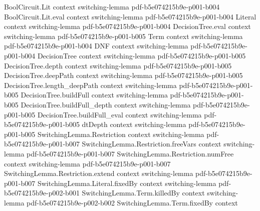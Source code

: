 \begin{lemma}
\label{SwitchingLemma.canonicalDTree_deepPath_length_ge}
\leanok
{}
\proofstep
  {BoolCircuit.Lit}
  {context}
  {switching-lemma}
  {pdf-b5e074215b9e-p001-b004}
\proofstep
  {BoolCircuit.Lit.eval}
  {context}
  {switching-lemma}
  {pdf-b5e074215b9e-p001-b004}
\proofstep
  {Literal}
  {context}
  {switching-lemma}
  {pdf-b5e074215b9e-p001-b004}
\proofstep
  {DecisionTree.eval}
  {context}
  {switching-lemma}
  {pdf-b5e074215b9e-p001-b005}
\proofstep
  {Term}
  {context}
  {switching-lemma}
  {pdf-b5e074215b9e-p001-b004}
\proofstep
  {DNF}
  {context}
  {switching-lemma}
  {pdf-b5e074215b9e-p001-b004}
\proofstep
  {DecisionTree}
  {context}
  {switching-lemma}
  {pdf-b5e074215b9e-p001-b005}
\proofstep
  {DecisionTree.depth}
  {context}
  {switching-lemma}
  {pdf-b5e074215b9e-p001-b005}
\proofstep
  {DecisionTree.deepPath}
  {context}
  {switching-lemma}
  {pdf-b5e074215b9e-p001-b005}
\proofstep
  {DecisionTree.length_deepPath}
  {context}
  {switching-lemma}
  {pdf-b5e074215b9e-p001-b005}
\proofstep
  {DecisionTree.buildFull}
  {context}
  {switching-lemma}
  {pdf-b5e074215b9e-p001-b005}
\proofstep
  {DecisionTree.buildFull_depth}
  {context}
  {switching-lemma}
  {pdf-b5e074215b9e-p001-b005}
\proofstep
  {DecisionTree.buildFull_eval}
  {context}
  {switching-lemma}
  {pdf-b5e074215b9e-p001-b005}
\proofstep
  {dtDepth}
  {context}
  {switching-lemma}
  {pdf-b5e074215b9e-p001-b005}
\proofstep
  {SwitchingLemma.Restriction}
  {context}
  {switching-lemma}
  {pdf-b5e074215b9e-p001-b007}
\proofstep
  {SwitchingLemma.Restriction.freeVars}
  {context}
  {switching-lemma}
  {pdf-b5e074215b9e-p001-b007}
\proofstep
  {SwitchingLemma.Restriction.numFree}
  {context}
  {switching-lemma}
  {pdf-b5e074215b9e-p001-b007}
\proofstep
  {SwitchingLemma.Restriction.extend}
  {context}
  {switching-lemma}
  {pdf-b5e074215b9e-p001-b007}
\proofstep
  {SwitchingLemma.Literal.fixedBy}
  {context}
  {switching-lemma}
  {pdf-b5e074215b9e-p002-b001}
\proofstep
  {SwitchingLemma.Term.killedBy}
  {context}
  {switching-lemma}
  {pdf-b5e074215b9e-p002-b002}
\proofstep
  {SwitchingLemma.Term.fixedBy}
  {context}

\end{lemma}
